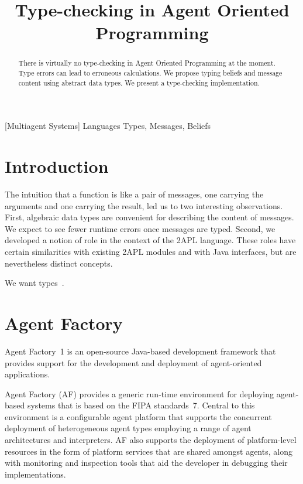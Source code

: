\documentclass[preprint]{sigplanconf} %
\title{Type-checking in Agent Oriented Programming}
\begin{document}
\maketitle
\begin{abstract} %
There is virtually no type-checking in Agent Oriented Programming at the
moment. Type errors can lead to erroneous calculations. We propose typing
beliefs and message content using abstract data types. We present a type-checking implementation.

\end{abstract} %
[Multiagent Systems]
\terms Languages
\keywords Types, Messages, Beliefs

\section{Introduction} %
The intuition that a function is like a pair of messages, one carrying the
arguments and one carrying the result, led us to two interesting
observations. First, algebraic data types are convenient for describing the
content of messages. We expect to see fewer runtime errors once messages
are typed. Second, we developed a notion of role in the context of the 2APL
language. These roles have certain similarities with existing 2APL modules
and with Java interfaces, but are nevertheless distinct concepts.

We want types~\cite{DBLP:conf/ctcs/Hagino87}.

\section{Agent Factory} %
Agent Factory~\cite{}1 is an open-source Java-based development framework
that provides support for the development and deployment of agent-oriented
applications.

Agent Factory (AF) provides a generic run-time environment for deploying
agent-based systems that is based on the FIPA standards~\cite{}7. Central
to this environment is a configurable agent platform that supports the
concurrent deployment of heterogeneous agent types employing a range of
agent architectures and interpreters. AF also supports the deployment of
platform-level resources in the form of platform services that are shared
amongst agents, along with monitoring and inspection tools that aid the
developer in debugging their implementations. 
\end{document}

